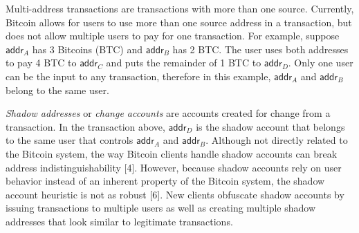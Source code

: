 Multi-address transactions are transactions with more than one source. Currently, Bitcoin allows for users to use more than one source address in a transaction, but does not allow multiple users to pay for one transaction. For example, suppose $\mathsf{addr}_A$ has 3 Bitcoins (BTC) and $\mathsf{addr}_B$ has 2 BTC. The user uses both addresses to pay 4 BTC to $\mathsf{addr}_C$ and puts the remainder of 1 BTC to $\mathsf{addr}_D$. Only one user can be the input to any transaction, therefore in this example, $\mathsf{addr}_A$ and $\mathsf{addr}_B$ belong to the same user.

\emph{Shadow addresses} or \emph{change accounts} are accounts created for change from a transaction. In the transaction above, $\mathsf{addr}_D$ is the shadow account that belongs to the same user that controls $\mathsf{addr}_A$ and $\mathsf{addr}_B$. Although not directly related to the Bitcoin system, the way Bitcoin clients handle shadow accounts can break address indistinguishability [4]. However, because shadow accounts rely on user behavior instead of an inherent property of the Bitcoin system, the shadow account heuristic is not as robust [6]. New clients obfuscate shadow accounts by issuing transactions to multiple users as well as creating multiple shadow addresses that look similar to legitimate transactions.



